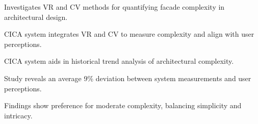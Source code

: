 

\item Investigates VR and CV methods for quantifying facade complexity in architectural design.
\item CICA system integrates VR and CV to measure complexity and align with user perceptions.
\item CICA system aids in historical trend analysis of architectural complexity.
\item Study reveals an average 9\% deviation between system measurements and user perceptions.
\item Findings show preference for moderate complexity, balancing simplicity and intricacy.



